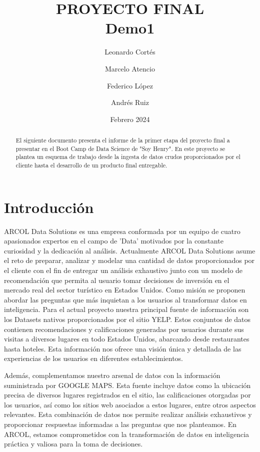 \documentclass[12pt]{article}
\title{PROYECTO FINAL\\
\large Demo1}
\author{Leonardo Cortés \and Marcelo Atencio \and Federico López \and Andrés Ruiz}
\date{Febrero 2024}
\begin{document}
\maketitle

\begin{abstract}
El siguiente documento presenta el informe de la primer etapa del proyecto final a presentar en el Boot Camp de Data Science de "Soy Henry". En este proyecto se plantea un esquema de trabajo desde la ingesta de datos crudos proporcionados por el cliente hasta el desarrollo de un producto final entregable.
\end{abstract}

\tableofcontents

\section{Introducción}
ARCOL Data Solutions es una empresa conformada por un equipo de cuatro apasionados expertos en el campo de 'Data' motivados por la constante curiosidad y la dedicación al análisis.  Actualmente ARCOL Data Solutions asume el reto de preparar, analizar y modelar una cantidad de datos proporcionados por el cliente con el fin de entregar un análisis exhaustivo junto con un modelo de recomendación que permita al usuario tomar decisiones de inversión en el mercado real del sector turístico en Estados Unidos.  
Como misión se proponen abordar las preguntas que más inquietan a los usuarios al transformar datos en inteligencia. 
Para el actual proyecto nuestra principal fuente de información son los Datasets nativos proporcionados por el sitio YELP. Estos conjuntos de datos contienen recomendaciones y calificaciones generadas por usuarios durante sus visitas a diversos lugares en todo Estados Unidos, abarcando desde restaurantes hasta hoteles. Esta información nos ofrece una visión única y detallada de las experiencias de los usuarios en diferentes establecimientos.

Además, complementamos nuestro arsenal de datos con la información suministrada por GOOGLE MAPS. Esta fuente incluye datos como la ubicación precisa de diversos lugares registrados en el sitio, las calificaciones otorgadas por los usuarios, así como los sitios web asociados a estos lugares, entre otros aspectos relevantes. Esta combinación de datos nos permite realizar análisis exhaustivos y proporcionar respuestas informadas a las preguntas que nos planteamos. En ARCOL, estamos comprometidos con la transformación de datos en inteligencia práctica y valiosa para la toma de decisiones.
\end{document}
